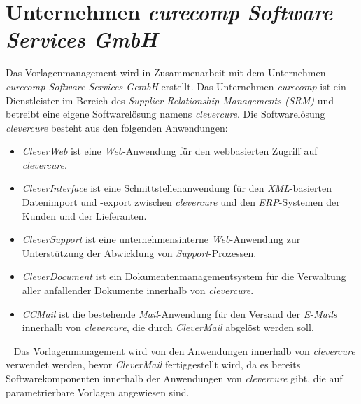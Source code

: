 \section{Unternehmen \emph{curecomp Software Services GmbH}}
Das Vorlagenmanagement wird in Zusammenarbeit mit dem Unternehmen \emph{curecomp Software Services GembH} erstellt. Das Unternehmen \emph{curecomp} ist ein Dienstleister im Bereich des \emph{Supplier-Relationship-Managements (SRM)} und betreibt eine eigene Softwarelösung namens \emph{clevercure}. Die Softwarelösung \emph{clevercure} besteht aus den folgenden Anwendungen:
\newline
\begin{itemize}
	\item\emph{CleverWeb} ist eine \emph{Web}-Anwendung für den webbasierten Zugriff auf \emph{clevercure}.
	\item\emph{CleverInterface} ist eine Schnittstellenanwendung für den \emph{XML}-basierten Datenimport und -export zwischen \emph{clevercure} und den \emph{ERP}-Systemen der Kunden und der Lieferanten.
	\item\emph{CleverSupport} ist eine unternehmensinterne \emph{Web}-Anwendung zur Unterstützung der Abwicklung von \emph{Support}-Prozessen.
	\item\emph{CleverDocument} ist ein Dokumentenmanagementsystem für die Verwaltung aller anfallender Dokumente innerhalb von \emph{clevercure}.
	\item\emph{CCMail} ist die bestehende \emph{Mail}-Anwendung für den Versand der \emph{E-Mails} innerhalb von \emph{clevercure}, die durch \emph{CleverMail} abgelöst werden soll.
\end{itemize}
\ \newline
Das Vorlagenmanagement wird von den Anwendungen innerhalb von \emph{clevercure} verwendet werden, bevor \emph{CleverMail} fertiggestellt wird, da es bereits Softwarekomponenten innerhalb der Anwendungen von \emph{clevercure} gibt, die auf parametrierbare Vorlagen angewiesen sind.

